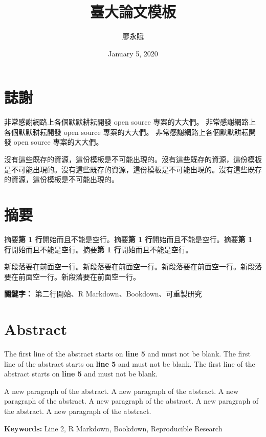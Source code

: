\documentclass[oneside]{book}
\title{臺大論文模板}
\author{廖永賦}
\date{January 5, 2020}
\theoremstyle{definition}
\theoremstyle{definition}
\theoremstyle{definition}
\theoremstyle{remark}
\begin{document}


\clearpage
{}

{}



\chapter*{誌謝}
非常感謝網路上各個默默耕耘開發 open source 專案的大大們。
非常感謝網路上各個默默耕耘開發 open source 專案的大大們。
非常感謝網路上各個默默耕耘開發 open source 專案的大大們。

沒有這些既存的資源，這份模板是不可能出現的。沒有這些既存的資源，這份模板是不可能出現的。沒有這些既存的資源，這份模板是不可能出現的。沒有這些既存的資源，這份模板是不可能出現的。


\chapter*{摘要}
摘要\textbf{第 1 行}開始而且不能是空行。摘要\textbf{第 1 行}開始而且不能是空行。摘要\textbf{第 1 行}開始而且不能是空行。摘要\textbf{第 1 行}開始而且不能是空行。

新段落要在前面空一行。新段落要在前面空一行。新段落要在前面空一行。新段落要在前面空一行。新段落要在前面空一行。
\bigbreak

\noindent
\textbf{關鍵字：} 第二行開始、R Markdown、Bookdown、可重製研究

\chapter*{Abstract}
The first line of the abstract starts on \textbf{line 5} and must not be blank. The first line of the abstract starts on \textbf{line 5} and must not be blank. The first line of the abstract starts on \textbf{line 5} and must not be blank.

A new paragraph of the abstract. A new paragraph of the abstract. A new paragraph of the abstract. A new paragraph of the abstract. A new paragraph of the abstract. A new paragraph of the abstract.
\bigbreak

\noindent
\textbf{Keywords:} Line 2, R Markdown, Bookdown, Reproducible Research
\end{document}
